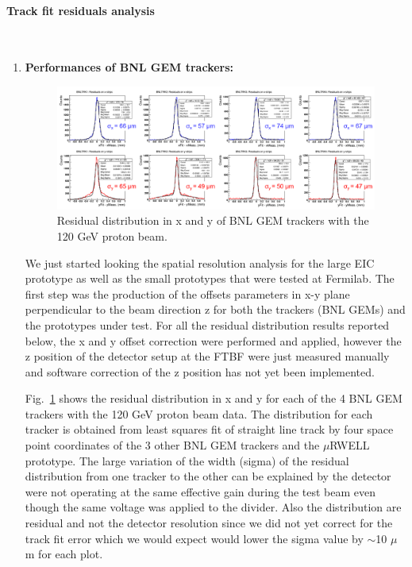 \paragraph*{Track fit residuals analysis}\mbox{}\\
%
\begin{enumerate}
\item \textbf{Performances of BNL GEM trackers:}
%
\begin{figure}[htb]
\centering
\includegraphics[width=1\columnwidth,trim={0pt 0mm 0pt 0mm},clip]{UVa_plots/trkResidual}
\caption{\label{fig:trkResidual} Residual distribution in x and y of BNL GEM trackers with the 120 GeV proton beam.}
\end{figure}
We  just started looking the spatial resolution analysis for the large EIC prototype as well as the small prototypes that were tested at Fermilab. The first step was the production of the offsets parameters in x-y plane perpendicular to the beam direction z for both the trackers (BNL GEMs) and the prototypes under test. For all the residual distribution results reported below, the x and y offset correction were performed and applied, however the z position of the detector setup at the FTBF were just measured manually and software correction of the z position has not yet been implemented. 

Fig.~\ref{fig:trkResidual} shows the residual distribution in x and y for each of the 4 BNL GEM trackers with the 120 GeV proton beam data. The distribution for each tracker is obtained from least squares fit of straight line track  by four space point coordinates of the 3 other BNL GEM trackers and the $\mu$RWELL prototype. The large variation of the width (sigma) of the residual distribution  from one tracker to  the other can be explained by the detector were not operating at the same effective gain during the test beam even though the same voltage was applied to the divider. Also the distribution are residual and not the detector resolution since we did not yet correct for the track fit error which we would expect would lower the sigma value by $\sim$10 $\mu$m for each plot. 


\end{enumerate}
